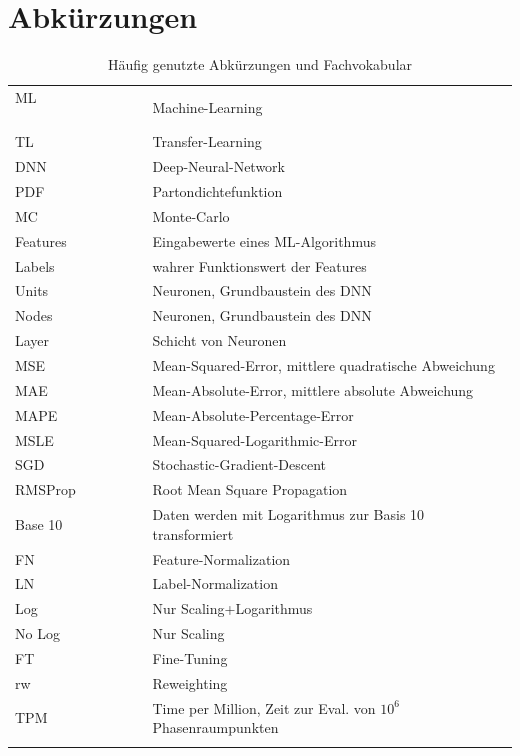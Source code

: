 \section{Abkürzungen}
\begin{table}[htp]
	\centering
	\begin{tabular}{ll}
		ML $\hspace{3cm}$& Machine-Learning \\
		TL & Transfer-Learning \\
		DNN & Deep-Neural-Network \\
		PDF & Partondichtefunktion \\
		MC & Monte-Carlo \\
		Features & Eingabewerte eines ML-Algorithmus \\
		Labels & wahrer Funktionswert der Features \\
		Units & Neuronen, Grundbaustein des DNN \\
		Nodes & Neuronen, Grundbaustein des DNN \\
		Layer & Schicht von Neuronen \\
		MSE & Mean-Squared-Error, mittlere quadratische Abweichung \\
		MAE & Mean-Absolute-Error, mittlere absolute Abweichung \\
		MAPE & Mean-Absolute-Percentage-Error\\
		MSLE & Mean-Squared-Logarithmic-Error \\
		SGD & Stochastic-Gradient-Descent\\
		RMSProp & Root Mean Square Propagation \\
		Base 10& Daten werden mit Logarithmus zur Basis 10 transformiert \\
		FN & Feature-Normalization \\
		LN & Label-Normalization \\
		Log & Nur Scaling+Logarithmus \\
		No Log & Nur Scaling\\
		FT & Fine-Tuning \\
		rw & Reweighting \\
		TPM & Time per Million, Zeit zur Eval. von $10^{6}$ Phasenraumpunkten \\
		&\\
	\end{tabular}
	\caption{Häufig genutzte Abkürzungen und Fachvokabular}
	\label{Abkürzungen}
\end{table}




